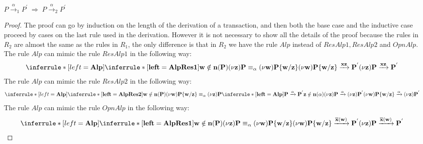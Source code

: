 \begin{theorem}
  $P\xrightarrow{\alpha}_{1}P^{'}\; \Rightarrow\; P\xrightarrow{\alpha}_{2}P^{'}$
  \begin{proof}
    The proof can go by induction on the length of the derivation of a transaction, and then both the base case and the inductive case proceed by cases on the last rule used in the derivation. However it is not necessary to show all the details of the proof because the rules in $R_{2}$ are almost the same as the rules in $R_{1}$, the only difference is that in $R_{2}$ we have the rule $Alp$ instead of $ResAlp1, ResAlp2$ and $OpnAlp$. The rule $Alp$ can mimic the rule $ResAlp1$ in the following way:
	\[
	  \inferrule* [left=\bf{Alp}]{
	      \inferrule* [left=\bf{AlpRes1}]{
		w\notin n(P)
	      }{
		(\nu z)P\equiv_{\alpha} (\nu w)P\{w/z\}
	      }
	    \\
	      (\nu w)P\{w/z\} \xrightarrow{xz}  P^{'}
	  }{
	    (\nu z)P \xrightarrow{xz} P^{'}
	  }
	\]
    The rule $Alp$ can mimic the rule $ResAlp2$ in the following way:
	\[
	  \inferrule* [left=\bf{Alp}]{
	      \inferrule* [left=\bf{AlpRes2}]{
		w\notin n(P)
	      }{
		(\nu w)P\{w/z\} \equiv_{\alpha} (\nu z)P
	      }
	    \\
	      \inferrule* [left=\bf{Alp}]{
		  P \xrightarrow{\alpha} P^{'}
		\\
		  z\notin n(\alpha)
	      }{
		(\nu z)P \xrightarrow{\alpha} (\nu z)P^{'}
	      }
	  }{
	    (\nu w)P\{w/z\} \xrightarrow{\alpha} (\nu z)P^{'}
	  }
	\]
    The rule $Alp$ can mimic the rule $OpnAlp$ in the following way:
	\[
	  \inferrule* [left=\bf{Alp}]{
	      \inferrule* [left=\bf{AlpRes1}]{
		w\notin n(P)
	      }{
		(\nu z)P\equiv_{\alpha} (\nu w)P\{w/z\}
	      }
	    \\
	      (\nu w)P\{w/z\}\xrightarrow{\overline{x}(w)}P^{'}
	  }{
	    (\nu z)P\xrightarrow{\overline{x}(w)}P^{'}
	  }
	\]
  \end{proof}
\end{theorem}


